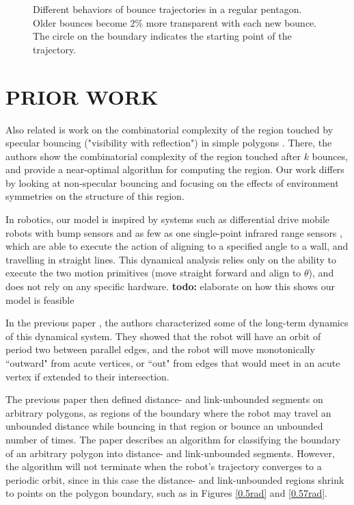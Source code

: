 \documentclass[letterpaper, 10 pt, conference]{ieeeconf}  %
\begin{document}
\begin{figure}
\begin{subfigure}{0.25\textwidth}

\end{subfigure}

\caption{Different behaviors of bounce trajectories in a regular pentagon.
Older bounces become 2\% more transparent with each new bounce. The circle on
the boundary indicates the starting point of the trajectory.}

\end{figure}

\section{PRIOR WORK}

Also related is work on the combinatorial complexity of the region touched
by specular bouncing ("visibility with reflection") in simple polygons
\cite{Aronov1996}. There, the authors show the combinatorial complexity of the
region touched after $k$ bounces, and provide a near-optimal algorithm for
computing the region. Our work differs by looking at non-specular bouncing and
focusing on the effects of environment symmetries on the structure of this
region.

In robotics, our model is inspired by systems such as differential drive mobile robots
with bump sensors and as few as one single-point infrared range sensors
\cite{LewOKa13}, which are able to execute the action of aligning to a specified
angle to a wall, and travelling in straight lines. This dynamical
analysis relies only on the ability to execute the two motion primitives (move
straight forward and align to $\theta$), and does not rely on any specific
hardware. \textbf{todo:} elaborate on how this shows our model is feasible

In the previous paper \cite{bounce}, the authors
characterized some of the long-term dynamics of this dynamical system. They
showed that the robot will have an orbit of period two between parallel edges,
and the robot will move monotonically ``outward" from acute vertices, or ``out" from
edges that would meet in an acute vertex if extended to their intersection.

The previous paper then defined distance- and link-unbounded
segments on arbitrary polygons, as regions of the boundary where the robot may
travel an unbounded distance while bouncing in that region or bounce an
unbounded number of times. The paper describes an algorithm for classifying the
 boundary of an arbitrary polygon into distance- and link-unbounded segments. However, the
algorithm will not terminate when the robot's trajectory converges to a periodic orbit, since in 
this case the distance- and link-unbounded regions shrink to points on the polygon
boundary, such as in Figures \ref{0.5rad} and \ref{0.57rad}.
\end{document}
